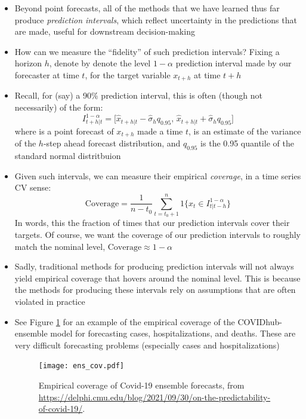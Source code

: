 \documentclass{article}
\begin{document}
\begin{itemize}
\item Beyond point forecasts, all of the methods that we have learned thus far
  produce \emph{prediction intervals}, which reflect uncertainty in the
  predictions that are made, useful for downstream decision-making   

\item How can we measure the ``fidelity'' of such prediction intervals? Fixing a
  horizon $h$, denote by  denote the level
  $1-\alpha$ prediction interval made by our forecaster at time $t$, for the
  target variable $x_{t+h}$ at time $t+h$    

\item Recall, for (say) a 90\% prediction interval, this is often (though not
  necessarily) of the form:
  \[
  I^{1-\alpha}_{t+h|t} = 
  \big[\hat{x}_{t+h|t} - \hat\sigma_h q_{0.95}, \, \hat{x}_{t+h|t} +  
  \hat\sigma_h q_{0.95} \big]
  \]
  where  is a point forecast of $x_{t+h}$ made a time
  $t$,  is an estimate of the variance of the $h$-step  
  ahead forecast distribution, and $q_{0.95}$ is the 0.95 quantile of the
  standard normal distritbuion  

\item Given such intervals, we can measure their empirical \emph{coverage}, in a
  time series CV sense:  
  \[
  \mathrm{Coverage} = \frac{1}{n-t_0} \sum_{t=t_0+1}^n 1\big\{ x_t \in 
  I^{1-\alpha}_{t|t-h} \big\}
  \]
  In words, this the fraction of times that our prediction intervals cover their
  targets. Of course, we want the coverage of our prediction intervals to
  roughly match the nominal level, $\mathrm{Coverage} \approx 1-\alpha$ 
  
\item Sadly, traditional methods for producing prediction intervals will not
  always yield empirical coverage that hovers around the nominal level. This is 
  because the methods for producing these intervals rely on assumptions that are
  often violated in practice

\item See Figure \ref{fig:ens_cov} for an example of the empirical coverage of
  the COVIDhub-ensemble model for forecasting cases, hospitalizations, and
  deaths. These are very difficult forecasting problems (especially cases and
  hospitalizations)    

\begin{figure}[htb]
\centering
\texttt{[image: ens\_cov.pdf]}
\caption{Empirical coverage of Covid-19 ensemble forecasts, from
  \url{https://delphi.cmu.edu/blog/2021/09/30/on-the-predictability-of-covid-19/}.} 
\label{fig:ens_cov}
\end{figure}


\end{itemize}
\end{document}
